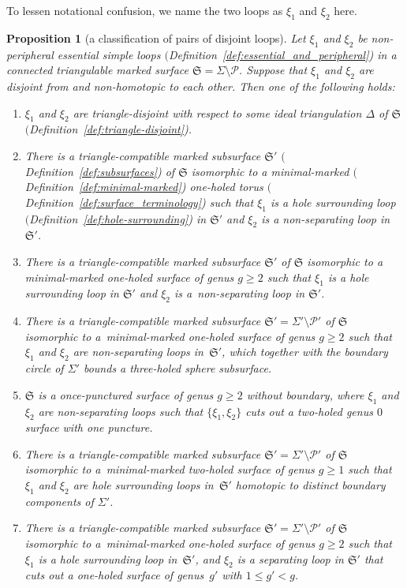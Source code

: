 \documentclass[pdftex]{sigma}
\numberwithin{equation}{section}
\newtheorem{Proposition}[Theorem]{Proposition}
\theoremstyle{definition}
\begin{document}
To lessen notational confusion, we name the two loops as $\xi_1$ and $\xi_2$ here.
\begin{Proposition}[a classification of pairs of disjoint loops]
\label{prop:classification_of_pair_of_loops}
Let $\xi_1$ and $\xi_2$ be non-peripheral essential simple loops $($Definition~{\rm \ref{def:essential_and_peripheral})} in a connected triangulable marked surface $\mathfrak{S} = \Sigma\setminus\mathcal{P}$. Suppose that $\xi_1$ and $\xi_2$ are disjoint from and non-homotopic to each other. Then one of the following holds:
\begin{enumerate}[label={\rm (PL\arabic*)}]\itemsep=0pt\setlength{\leftskip}{0.22cm}
\item\label{PL1} $\xi_1$ and $\xi_2$ are triangle-disjoint with respect to some ideal triangulation $\Delta$ of $\mathfrak{S}$ $($Defini\-tion~{\rm \ref{def:triangle-disjoint})}.
\item\label{PL2} There is a triangle-compatible marked subsurface $\mathfrak{S}'$ $($Definition~{\rm \ref{def:subsurfaces})} of $\mathfrak{S}$ isomorphic to a minimal-marked $($Definition~{\rm \ref{def:minimal-marked})} one-holed torus $($Definition~{\rm \ref{def:surface_terminology})} such that $\xi_1$ is a hole surrounding loop $($Definition~{\rm \ref{def:hole-surrounding})} in $\mathfrak{S}'$ and $\xi_2$ is a non-separating loop in $\mathfrak{S}'$.
\item\label{PL3} There is a triangle-compatible marked subsurface $\mathfrak{S}'$ of $\mathfrak{S}$ isomorphic to a minimal-marked one-holed surface of genus $g\ge 2$ such that $\xi_1$ is a hole surrounding loop in $\mathfrak{S}'$ and $\xi_2$ is a~non-separating loop in $\mathfrak{S}'$.
\item\label{PL4} There is a triangle-compatible marked subsurface $\mathfrak{S}' = \Sigma'\setminus \mathcal{P}'$ of $\mathfrak{S}$ isomorphic to a~mini\-mal-marked one-holed surface of genus $g\ge 2$ such that $\xi_1$ and $\xi_2$ are non-separating loops in~$\mathfrak{S}'$, which together with the boundary circle of $\Sigma'$ bounds a three-holed sphere subsurface.
\item\label{PL5} $\mathfrak{S}$ is a once-punctured surface of genus $g\ge 2$ without boundary, where $\xi_1$ and $\xi_2$ are non-separating loops such that $\{\xi_1,\xi_2\}$ cuts out a two-holed genus $0$ surface with one puncture.
\item\label{PL6} There is a triangle-compatible marked subsurface $\mathfrak{S}' = \Sigma'\setminus \mathcal{P}'$ of $\mathfrak{S}$ isomorphic to a~mini\-mal-marked two-holed surface of genus $g\ge 1$ such that $\xi_1$ and $\xi_2$ are hole surrounding loops in~$\mathfrak{S}'$ homotopic to distinct boundary components of $\Sigma'$.
\item\label{PL7} There is a triangle-compatible marked subsurface $\mathfrak{S}' = \Sigma'\setminus \mathcal{P}'$ of $\mathfrak{S}$ isomorphic to a~mini\-mal-marked one-holed surface of genus $g\ge 2$ such that $\xi_1$ is a hole surrounding loop in~$\mathfrak{S}'$, and $\xi_2$ is a separating loop in $\mathfrak{S}'$ that cuts out a one-holed surface of genus~$g'$ with $1\le g'<g$.
\end{enumerate}
\end{Proposition}
\end{document}
